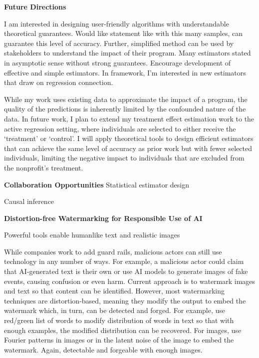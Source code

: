\documentclass[11pt]{article}
\begin{document}
{{ \large \textbf{Future Directions}}

I am interested in designing user-friendly algorithms with understandable theoretical guarantees.
Would like statement like with this many samples, can guarantee this level of accuracy.
Further, simplified method can be used by stakeholders to understand the impact of their program.
Many estimators stated in asymptotic sense without strong guarantees.
Encourage development of effective and simple estimators.
In framework, I'm interested in new estimators that draw on regression connection.

While my work uses existing data to approximate the impact of a program, the quality of the predictions is inherently limited by the confounded nature of the data. In future work, I plan to extend my treatment effect estimation work to the active regression setting, where individuals are selected to either receive the ‘treatment’ or ‘control’. 
I will apply theoretical tools to design efficient estimators that can achieve the same level of accuracy as prior work but with fewer selected individuals, limiting the negative impact to individuals that are excluded from the nonprofit’s treatment.

{ \large \textbf{Collaboration Opportunities}}
Statistical estimator design

Causal inference

\begin{center}
{ \large \textbf{Distortion-free Watermarking for Responsible Use of AI}}
\end{center}

Powerful tools enable humanlike text and realistic images

While companies work to add guard rails, malicious actors can still use technology in any number of ways. For example, a malicious actor could claim that AI-generated text is their own or use AI models to generate images of fake events, causing confusion or even harm.
Current approach is to watermark images and text so that content can be identified.
However, most watermarking techniques are distortion-based, meaning they modify the output to embed the watermark which, in turn, can be detected and forged.
For example, use red/green list of words to modify distribution of words in text so that with enough examples, the modified distribution can be recovered.
For images, use Fourier patterns in images or in the latent noise of the image to embed the watermark.
Again, detectable and forgeable with enough images.

}
\end{document}
